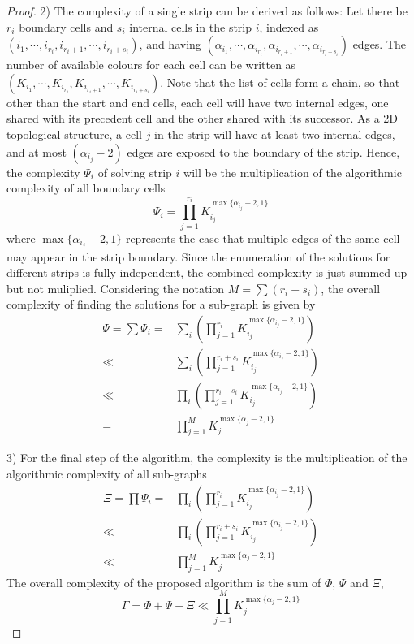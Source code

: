 \documentclass[journal]{IEEEtran}
\begin{document}
\begin{proof}
2) The complexity of a single strip can be derived as follows: Let there be $r_i$ boundary cells and $s_i$ internal cells in the strip $i$, 
indexed as $( i_1, \cdots, i_{r_i}, i_{r_i+1}, \cdots, i_{r_i+s_i})$, 
and having $(\alpha_{i_1}, \cdots, \alpha_{i_{r_i}}, \alpha_{i_{r_i+1}}, \cdots, \alpha_{i_{r_i+s_i}})$ edges. 
The number of available colours for each cell can be  written as $(K_{i_1}, \cdots, K_{i_{r_i}}, K_{i_{r_i+1}}, \cdots, K_{i_{r_i+s_i}})$. 
Note that the list of cells form a chain, so that other than the start and end cells, each cell will have two internal edges, one shared with its precedent cell and the 
other shared with its successor. As a 2D topological structure, a cell $j$ in the strip will have at least two internal edges, and at most $(\alpha_{i_j}-2)$ edges are exposed to the boundary of the strip. 
Hence, the complexity $\Psi_i$  of solving strip $i$ will be the multiplication of the algorithmic complexity of all boundary cells 
\begin{equation}
\Psi_i = \prod\limits_{j = 1}^{r_i} K_{i_j}^{\max\{\alpha_{i_j}-2, 1\}}
\end{equation}
where $\max\{\alpha_{i_j}-2, 1\}$ represents the case that multiple edges of the same cell may appear in the strip boundary. 
Since the enumeration of the solutions for different strips is fully independent, the combined complexity is just summed up but not muliplied. 
Considering the notation $M = \sum (r_i+s_i)$, the overall complexity of finding the solutions for a sub-graph is given by
\begin{equation}
\begin{aligned}
\Psi = \sum \Psi_i = & \sum\limits_{i} \left(\prod\limits_{j = 1}^{r_i} K_{i_j}^{\max\{\alpha_{i_j}-2, 1\}}\right)\\
\ll & \sum\limits_{i} \left(\prod\limits_{j = 1}^{r_i+s_i} K_{i_j}^{\max\{\alpha_{i_j}-2, 1\}}\right)\\
\ll&\prod\limits_{i}\left(\prod\limits_{j = 1}^{r_i+s_i} K_{i_j}^{\max\{\alpha_{i_j}-2, 1\}}\right)\\
=&\prod\limits_{j = 1}^M K_j^{\max\{\alpha_j -2, 1\}}
\end{aligned}
\end{equation}

3) For the final step of the algorithm, the complexity is the multiplication of the algorithmic complexity of all sub-graphs 
\begin{equation}
\begin{aligned}
\Xi = \prod \Psi_i = & \prod\limits_i \left(\prod\limits_{j = 1}^{r_i} K_{i_j}^{\max\{\alpha_{i_j}-2, 1\}}\right)\\
\ll&  \prod\limits_i \left(\prod\limits_{j = 1}^{r_i+s_i} K_{i_j}^{\max\{\alpha_{i_j}-2, 1\}}\right)\\
\ll& \prod\limits_{j = 1}^M K_j^{\max\{\alpha_j-2, 1\}}
\end{aligned}
\end{equation}
The overall complexity of the proposed algorithm is the sum of $\Phi$, $\Psi$ and $\Xi$, 
\begin{equation}
\Gamma =\Phi+\Psi+\Xi \ll  \prod\limits_{j = 1}^M K_j^{\max\{\alpha_j-2, 1\}}
\end{equation}
\end{proof}
\end{document}
